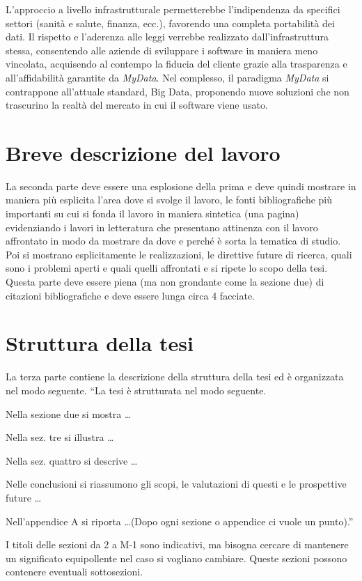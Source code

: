 L’approccio a livello infrastrutturale permetterebbe l’indipendenza da specifici settori (sanit\`a e salute, finanza, ecc.), favorendo una completa portabilit\`a dei dati. Il rispetto e l’aderenza alle leggi verrebbe realizzato dall’infrastruttura stessa, consentendo alle aziende di sviluppare i software in maniera meno vincolata, acquisendo al contempo la fiducia del cliente grazie alla trasparenza e all’affidabilit\`a garantite da \textit{MyData}.
Nel complesso, il paradigma \textit{MyData} si contrappone all’attuale standard, Big Data, proponendo nuove soluzioni che non trascurino la realt\`a del mercato in cui il software viene usato.


\section{Breve descrizione del lavoro}
La seconda parte deve essere una esplosione della prima e deve quindi mostrare in maniera pi\`u esplicita l'area dove si svolge il lavoro, le fonti bibliografiche pi\`u importanti su cui si fonda il lavoro in maniera sintetica (una pagina) evidenziando i lavori in letteratura che presentano attinenza con il lavoro affrontato in modo da mostrare da dove e perch\'e \`e sorta la tematica di studio. Poi si mostrano esplicitamente le realizzazioni, le direttive future di ricerca, quali sono i problemi aperti e quali quelli affrontati e si ripete lo scopo della tesi. Questa parte deve essere piena (ma non grondante come la sezione due) di citazioni bibliografiche e deve essere lunga circa 4 facciate.

\section{Struttura della tesi}
La terza parte contiene la descrizione della struttura della tesi ed \`e organizzata nel modo seguente.
``La tesi \`e strutturata nel modo seguente.

Nella sezione due si mostra \dots

Nella sez. tre si illustra \dots

Nella sez. quattro si descrive \dots

Nelle conclusioni si riassumono gli scopi, le valutazioni di questi e le prospettive future \dots

Nell'appendice A si riporta \dots (Dopo ogni sezione o appendice ci vuole un punto).''

I titoli delle sezioni da 2 a M-1 sono indicativi, ma bisogna cercare di mantenere un significato equipollente nel caso si vogliano cambiare. Queste sezioni possono contenere eventuali sottosezioni.

